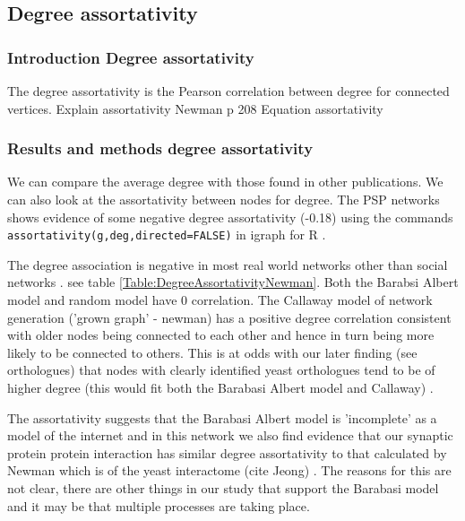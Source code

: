 \subsection{Degree assortativity}
\label{sec:degree assortativity}
\subsubsection{Introduction Degree assortativity}
The degree assortativity is the Pearson correlation between degree for connected vertices.\cite{noldus2015assortativity} Explain assortativity
Newman p 208
Equation assortativity


\subsubsection{Results and methods degree assortativity}
We can compare the average degree with those found in other publications. We can also look at the assortativity between nodes for degree. The PSP networks shows evidence of some negative degree assortativity (-0.18) using the commands \texttt{assortativity(g,deg,directed=FALSE)} in igraph for R .

The degree association is negative in most real world networks other than social networks \cite{newman2002assortative}.  see table \ref{Table:DegreeAssortativityNewman}. Both the Barabsi Albert model and random model have 0 correlation. The Callaway model of network generation ('grown graph' - newman) has a positive degree correlation consistent with older nodes being connected to each other and hence in turn being more likely to be connected to others. This is at odds with our later finding (see orthologues) that nodes with clearly identified yeast orthologues tend to be of higher degree (this would fit both the Barabasi Albert model and Callaway) . 

The assortativity suggests that the Barabasi Albert model is 'incomplete' as a model of the internet \cite{newman2002assortative} and in this network we also find evidence that our synaptic protein protein interaction has similar degree assortativity to that calculated by Newman which is of the yeast interactome (cite Jeong) . The reasons for this are not clear, there are other things in our study that support the Barabasi model and it may be that multiple processes are taking place. 

